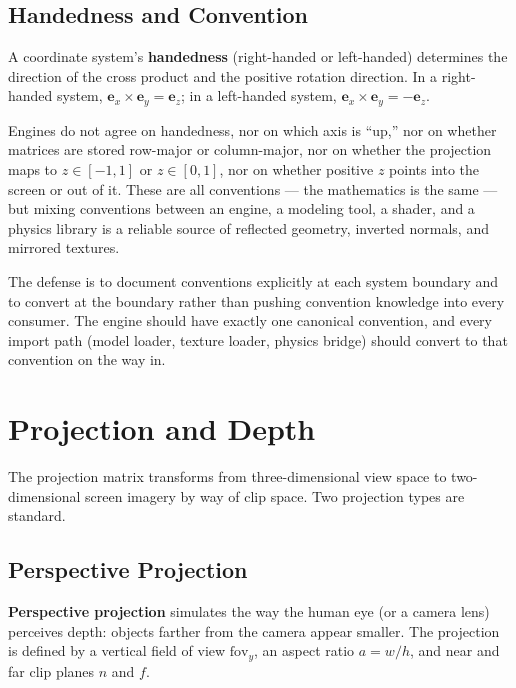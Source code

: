 \documentclass[
  11pt,
  letterpaper,
  DIV=11,
  numbers=noendperiod,
  twoside,
  open=right]{scrreprt}
\begin{document}
\subsection{Handedness and Convention}\label{handedness-and-convention}

A coordinate system's \textbf{handedness} (right-handed or left-handed)
determines the direction of the cross product and the positive rotation
direction. In a right-handed system,
\(\mathbf{e}_x \times \mathbf{e}_y = \mathbf{e}_z\); in a left-handed
system, \(\mathbf{e}_x \times \mathbf{e}_y = -\mathbf{e}_z\).

Engines do not agree on handedness, nor on which axis is ``up,'' nor on
whether matrices are stored row-major or column-major, nor on whether
the projection maps to \(z \in [-1, 1]\) or \(z \in [0, 1]\), nor on
whether positive \(z\) points into the screen or out of it. These are
all conventions --- the mathematics is the same --- but mixing
conventions between an engine, a modeling tool, a shader, and a physics
library is a reliable source of reflected geometry, inverted normals,
and mirrored textures.

The defense is to document conventions explicitly at each system
boundary and to convert at the boundary rather than pushing convention
knowledge into every consumer. The engine should have exactly one
canonical convention, and every import path (model loader, texture
loader, physics bridge) should convert to that convention on the way in.

\section{Projection and Depth}\label{projection-and-depth}

The projection matrix transforms from three-dimensional view space to
two-dimensional screen imagery by way of clip space. Two projection
types are standard.

\subsection{Perspective Projection}\label{perspective-projection}

\textbf{Perspective projection} simulates the way the human eye (or a
camera lens) perceives depth: objects farther from the camera appear
smaller. The projection is defined by a vertical field of view
\(\text{fov}_y\), an aspect ratio \(a = w/h\), and near and far clip
planes \(n\) and \(f\).
\end{document}
